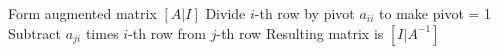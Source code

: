\begin{algorithm}[H]
\caption{Gauss-Jordan Method for Matrix Inversion}
\begin{algorithmic}[1]
\STATE Form augmented matrix $[A|I]$
    \STATE Divide $i$-th row by pivot $a_{ii}$ to make pivot = 1
        \STATE Subtract $a_{ji}$ times $i$-th row from $j$-th row
    \ENDFOR
\ENDFOR
\STATE Resulting matrix is $[I|A^{-1}]$
\end{algorithmic}
\end{algorithm}